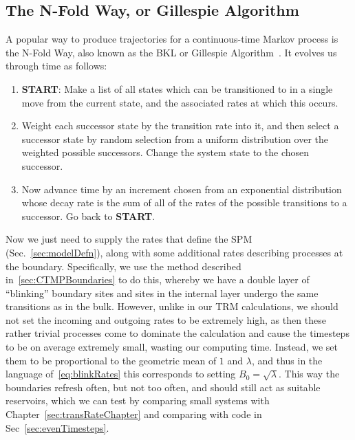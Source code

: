 \subsection{The N-Fold Way, or Gillespie Algorithm} \label{sec:nFoldWay}
A popular way to produce trajectories for a continuous-time Markov process is the N-Fold Way, also known as the
BKL or Gillespie Algorithm~\cite{Bortz1975, Prados1997, voterKMC}. It evolves us through time as follows:
\begin{enumerate}
 \item \textbf{START}: Make a list of all states which can be transitioned to in a single move from the 
 current state, and the associated rates at which this occurs.
 \item Weight each successor state by the transition rate into it, and then select a successor state by
 random selection from a uniform distribution over the weighted possible successors. Change the system
 state to the chosen successor. \label{weightingChoose}
 \item Now advance time by an increment chosen from an exponential distribution whose decay rate 
 is the sum of all of the rates of the possible transitions to a successor. Go back to \textbf{START}. \label{timestepChoose}
\end{enumerate}
Now we just need to supply the rates that define the SPM 
(Sec.~\ref{sec:modelDefn}), 
along with some additional rates describing processes at the boundary. Specifically, we use the method described 
in~\ref{sec:CTMPBoundaries} to do this, whereby we have a double layer of ``blinking'' boundary sites
and sites in the internal layer undergo the same transitions as in the bulk. However, unlike in our TRM
calculations, we should not set the incoming and outgoing rates to be extremely high, as then these rather
trivial processes come to dominate the calculation and cause the timesteps to be on average extremely small, wasting our computing time. Instead, we set them to
be proportional to the geometric mean of $1$ and $\lambda$, and thus in the language of~\eqref{eq:blinkRates}
this corresponds to setting $B_0 = \sqrt{\lambda}$. This way the boundaries refresh often, but not too
often, and should still act as suitable reservoirs, which we can test by comparing small systems with 
Chapter~\ref{sec:transRateChapter} and comparing with code in Sec~\ref{sec:evenTimesteps}.


